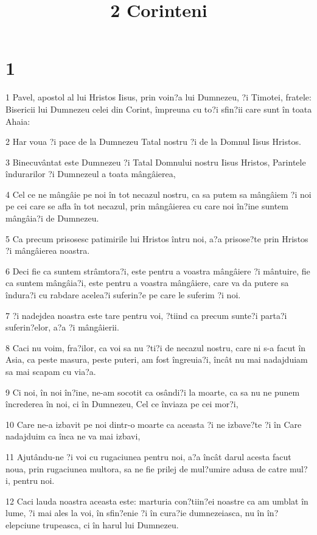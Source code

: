 

\title{2 Corinteni}


\chapter{1}

\par 1 Pavel, apostol al lui Hristos Iisus, prin voin?a lui Dumnezeu, ?i Timotei, fratele: Bisericii lui Dumnezeu celei din Corint, împreuna cu to?i sfin?ii care sunt în toata Ahaia:
\par 2 Har voua ?i pace de la Dumnezeu Tatal nostru ?i de la Domnul Iisus Hristos.
\par 3 Binecuvântat este Dumnezeu ?i Tatal Domnului nostru Iisus Hristos, Parintele îndurarilor ?i Dumnezeul a toata mângâierea,
\par 4 Cel ce ne mângâie pe noi în tot necazul nostru, ca sa putem sa mângâiem ?i noi pe cei care se afla în tot necazul, prin mângâierea cu care noi în?ine suntem mângâia?i de Dumnezeu.
\par 5 Ca precum prisosesc patimirile lui Hristos întru noi, a?a prisose?te prin Hristos ?i mângâierea noastra.
\par 6 Deci fie ca suntem strâmtora?i, este pentru a voastra mângâiere ?i mântuire, fie ca suntem mângâia?i, este pentru a voastra mângâiere, care va da putere sa îndura?i cu rabdare acelea?i suferin?e pe care le suferim ?i noi.
\par 7 ?i nadejdea noastra este tare pentru voi, ?tiind ca precum sunte?i parta?i suferin?elor, a?a ?i mângâierii.
\par 8 Caci nu voim, fra?ilor, ca voi sa nu ?ti?i de necazul nostru, care ni s-a facut în Asia, ca peste masura, peste puteri, am fost îngreuia?i, încât nu mai nadajduiam sa mai scapam cu via?a.
\par 9 Ci noi, în noi în?ine, ne-am socotit ca osândi?i la moarte, ca sa nu ne punem încrederea în noi, ci în Dumnezeu, Cel ce înviaza pe cei mor?i,
\par 10 Care ne-a izbavit pe noi dintr-o moarte ca aceasta ?i ne izbave?te ?i în Care nadajduim ca înca ne va mai izbavi,
\par 11 Ajutându-ne ?i voi cu rugaciunea pentru noi, a?a încât darul acesta facut noua, prin rugaciunea multora, sa ne fie prilej de mul?umire adusa de catre mul?i, pentru noi.
\par 12 Caci lauda noastra aceasta este: marturia con?tiin?ei noastre ca am umblat în lume, ?i mai ales la voi, în sfin?enie ?i în cura?ie dumnezeiasca, nu în în?elepciune trupeasca, ci în harul lui Dumnezeu.
